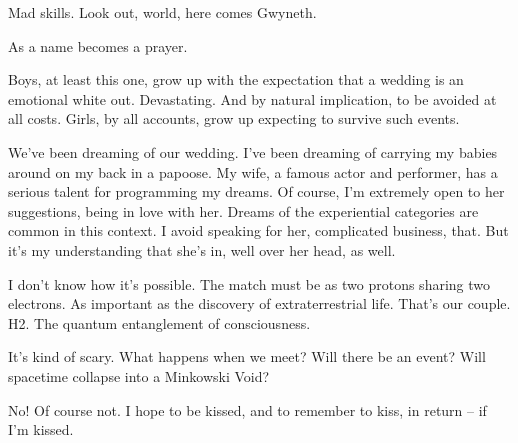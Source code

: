 Mad skills.  Look out, world, here comes Gwyneth.


As a name becomes a prayer.

\bye

\vfill
\break



﻿Boys, at least this one, grow up with the expectation that a wedding
is an emotional white out.  Devastating.  And by natural implication,
to be avoided at all costs.  Girls, by all accounts, grow up expecting
to survive such events.


We've been dreaming of our wedding.  I've been dreaming of carrying my
babies around on my back in a papoose.  My wife, a famous actor and
performer, has a serious talent for programming my dreams.  Of course,
I'm extremely open to her suggestions, being in love with her.  Dreams
of the experiential categories are common in this context.  I avoid
speaking for her, complicated business, that.  But it's my
understanding that she's in, well over her head, as well.

\bye

\vfill
\break



﻿I don't know how it's possible.  The match must be as two protons
sharing two electrons.  As important as the discovery of
extraterrestrial life.  That's our couple.  H2.  The quantum
entanglement of consciousness.


It's kind of scary.  What happens when we meet?  Will there be an
event?  Will spacetime collapse into a Minkowski Void?


No!  Of course not.  I hope to be kissed, and to remember to kiss, in
return -- if I'm kissed.

\bye

\vfill
\bye
